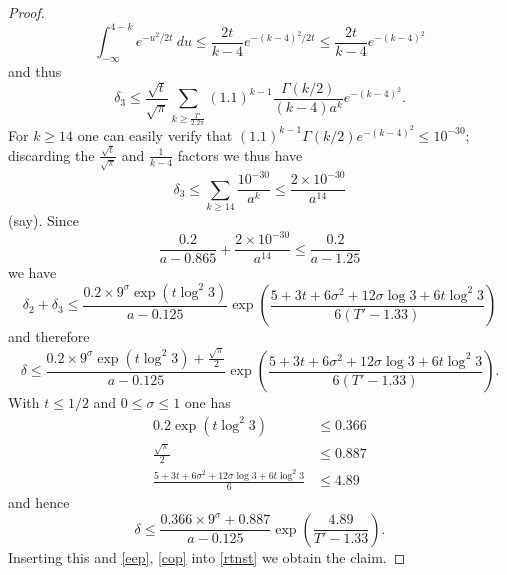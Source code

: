 \begin{proof}
$$ \int_{-\infty}^{4-k} e^{-u^2/2t}\ du \leq \frac{2t}{k-4} e^{-(k-4)^2/2t} \leq \frac{2t}{k-4} e^{-(k-4)^2}$$
and thus
$$ \delta_3 \leq \frac{\sqrt{t}}{\sqrt{\pi}} \sum_{k \geq \frac{T'}{2.2 \pi}} (1.1)^{k-1} \frac{\Gamma(k/2)}{(k-4) a^k} e^{-(k-4)^2}.$$
For $k \geq 14$ one can easily verify that $(1.1)^{k-1} \Gamma(k/2) e^{-(k-4)^2} \leq 10^{-30}$; discarding the $\frac{\sqrt{t}}{\sqrt{\pi}}$ and $\frac{1}{k-4}$ factors we thus have
$$ \delta_3 \leq \sum_{k \geq 14} \frac{10^{-30}}{a^k} \leq \frac{2 \times 10^{-30}}{a^{14}}$$
(say).   Since
$$ \frac{0.2}{a-0.865} + \frac{2 \times 10^{-30}}{a^{14}} \leq \frac{0.2}{a-1.25}$$
we have
$$ \delta_2+\delta_3 \leq \frac{0.2 \times 9^\sigma \exp( t \log^2 3 )}{a-0.125} \exp( \frac{5+3t+6\sigma^2 + 12 \sigma \log 3 + 6t \log^2 3}{6(T'-1.33)} )$$
and therefore
$$ \delta \leq \frac{0.2 \times 9^\sigma \exp( t \log^2 3 ) + \frac{\sqrt{\pi}}{2}}{a-0.125} \exp( \frac{5+3t+6\sigma^2 + 12 \sigma \log 3 + 6t \log^2 3}{6(T'-1.33)} ).$$
With $t \leq 1/2$ and $0 \leq \sigma \leq 1$ one has
\begin{align*}
 0.2 \exp(t \log^2 3) &\leq 0.366 \\
\frac{\sqrt{\pi}}{2} &\leq 0.887 \\
\frac{5 + 3t + 6\sigma^2 + 12 \sigma \log 3 + 6t \log^2 3}{6} &\leq 4.89
\end{align*}
and hence
$$ \delta \leq \frac{0.366 \times 9^\sigma + 0.887}{a-0.125} \exp( \frac{4.89}{T'-1.33} ).$$
Inserting this and \eqref{eep}, \eqref{cop} into \eqref{rtnst} we obtain the claim.
\end{proof}

